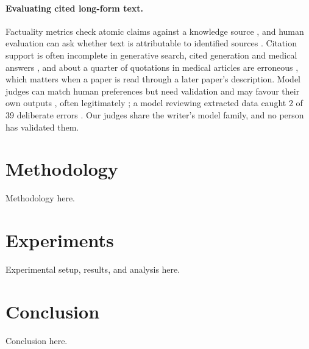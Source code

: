 \documentclass{article} %
\begin{document}
\paragraph{Evaluating cited long-form text.}
Factuality metrics check atomic claims against a knowledge source \citep{min2023factscore,wei2024longform,Song2024VeriscoreEvaluating}, and human evaluation can ask whether text is attributable to identified sources \citep{Rashkin2021MeasuringAttribution}. Citation support is often incomplete in generative search, cited generation and medical answers \citep{Liu2023EvaluatingVerifiability,gao2023enabling,wu2025automated}, and about a quarter of quotations in medical articles are erroneous \citep{jergas2015quotation}, which matters when a paper is read through a later paper's description. Model judges can match human preferences \citep{zheng2023judging} but need validation \citep{shankar2024who} and may favour their own outputs \citep{panickssery2024llm}, often legitimately \citep{Chen2025DoLlm}; a model reviewing extracted data caught 2 of 39 deliberate errors \citep{Stewartevans2025ExpeditingData}. Our judges share the writer's model family, and no person has validated them.

\section{Methodology}
\label{sec:method}
Methodology here.

\section{Experiments}
\label{sec:experiments}
Experimental setup, results, and analysis here.

\section{Conclusion}
\label{sec:conclusion}
Conclusion here.




\end{document}
